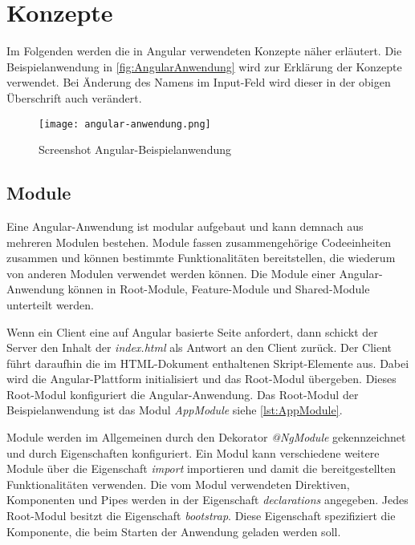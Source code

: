 \section{Konzepte}



Im Folgenden werden die in Angular verwendeten Konzepte näher erläutert. Die Beispielanwendung in \autoref{fig:AngularAnwendung} wird zur Erklärung der Konzepte verwendet. Bei Änderung des Namens im Input-Feld wird dieser in der obigen Überschrift auch verändert.

\begin{figure}
	\centering
	\texttt{[image: angular-anwendung.png]}
	\caption{Screenshot Angular-Beispielanwendung} 
	\label{fig:AngularAnwendung}
\end{figure}



\subsection{Module}

Eine Angular-Anwendung ist modular aufgebaut und kann demnach aus mehreren Modulen bestehen. Module fassen zusammengehörige Codeeinheiten zusammen und können bestimmte Funktionalitäten bereitstellen, die wiederum von anderen Modulen verwendet werden können. \autocites[vgl.][103\psqq]{Steyer.2017} Die Module einer Angular-Anwendung können in Root-Module, Feature-Module und Shared-Module unterteilt werden. 

Wenn ein Client eine auf Angular basierte Seite anfordert, dann schickt der Server den Inhalt der \textit{index.html} als Antwort an den Client zurück. Der Client führt daraufhin die im HTML-Dokument enthaltenen Skript-Elemente aus. Dabei wird die Angular-Plattform initialisiert und das Root-Modul übergeben. Dieses Root-Modul konfiguriert die Angular-Anwendung.\autocites[vgl.][60]{Steyer.2017}[vgl.][226\psqq]{Freeman.2018}  Das Root-Modul der Beispielanwendung ist das Modul \textit{AppModule} siehe \autoref{lst:AppModule}. 

Module werden im Allgemeinen durch den Dekorator \textit{@NgModule} gekennzeichnet und durch Eigenschaften konfiguriert. Ein Modul kann verschiedene weitere Module über die Eigenschaft \textit{import} importieren und damit die bereitgestellten Funktionalitäten verwenden. Die vom Modul verwendeten Direktiven, Komponenten und Pipes werden in der Eigenschaft \textit{declarations} angegeben. Jedes Root-Modul besitzt die Eigenschaft \textit{bootstrap}. Diese Eigenschaft spezifiziert die Komponente, die beim Starten der Anwendung geladen werden soll. 

